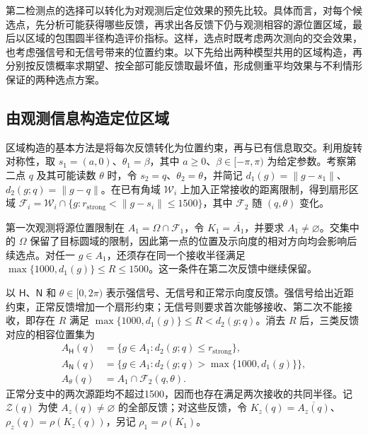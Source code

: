 \documentclass[UTF8,a4paper,zihao=-4,fontset=none]{ctexart}
\begin{document}
第二检测点的选择可以转化为对观测后定位效果的预先比较。具体而言，对每个候选点，先分析可能获得哪些反馈，再求出各反馈下仍与观测相容的源位置区域，最后以区域的包围圆半径构造评价指标。这样，选点时既考虑两次测向的交会效果，也考虑强信号和无信号带来的位置约束。以下先给出两种模型共用的区域构造，再分别按反馈概率求期望、按全部可能反馈取最坏值，形成侧重平均效果与不利情形保证的两种选点方案。

\subsection{由观测信息构造定位区域}

区域构造的基本方法是将每次反馈转化为位置约束，再与已有信息取交。利用旋转对称性，取 \(s_1=(a,0)\)、\(\theta_1=\beta\)，其中 \(a\ge0\)、\(\beta\in[-\pi,\pi)\) 为给定参数。考察第二点 \(q\) 及其可能读数 \(\theta\) 时，令 \(s_2=q\)、\(\theta_2=\theta\)，并简记 \(d_1(g)=\|g-s_1\|\)、\(d_2(g;q)=\|g-q\|\)。在已有角域 \(\mathcal W_i\) 上加入正常接收的距离限制，得到扇形区域 \(\mathcal F_i=\mathcal W_i\cap\{g:r_{\mathrm{strong}}<\|g-s_i\|\le1500\}\)，其中 \(\mathcal F_2\) 随 \((q,\theta)\) 变化。

第一次观测将源位置限制在 \(A_1=\Omega\cap\mathcal F_1\)，令 \(K_1=\overline{A_1}\)，并要求 \(A_1\ne\varnothing\)。交集中的 \(\Omega\) 保留了目标圆域的限制，因此第一点的位置及示向度的相对方向均会影响后续选点。对任一 \(g\in A_1\)，还须存在同一个接收半径满足 \(\max\{1000,d_1(g)\}\le R\le1500\)。这一条件在第二次反馈中继续保留。

以 \(\mathsf H\)、\(\mathsf N\) 和 \(\theta\in[0,2\pi)\) 表示强信号、无信号和正常示向度反馈。强信号给出近距约束，正常反馈增加一个扇形约束；无信号则要求首次能够接收、第二次不能接收，即存在 \(R\) 满足 \(\max\{1000,d_1(g)\}\le R<d_2(g;q)\)。消去 \(R\) 后，三类反馈对应的相容位置集为
\begin{equation}
\begin{aligned}
A_{\mathsf H}(q)&=\{g\in A_1:d_2(g;q)\le r_{\mathrm{strong}}\},\\
A_{\mathsf N}(q)&=\{g\in A_1:d_2(g;q)>\max\{1000,d_1(g)\}\},\\
A_\theta(q)&=A_1\cap\mathcal F_2(q,\theta).
\end{aligned}
\label{eq:q2-pair-regions}
\end{equation}
正常分支中的两次源距均不超过1500，因而也存在满足两次接收的共同半径。记 \(\mathcal Z(q)\) 为使 \(A_z(q)\ne\varnothing\) 的全部反馈；对这些反馈，令 \(K_z(q)=\overline{A_z(q)}\)、\(\rho_z(q)=\rho(K_z(q))\)，另记 \(\rho_1=\rho(K_1)\)。
\end{document}
